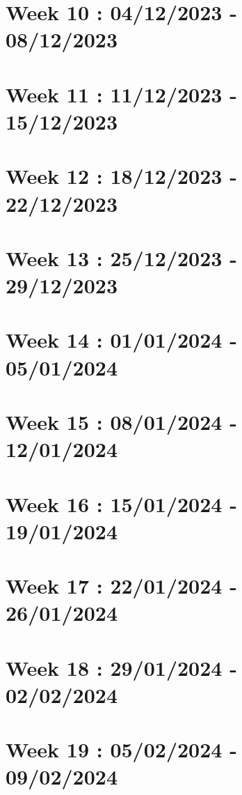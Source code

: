 \documentclass[french]{article}
\begin{document}
	\section{Week 10 : 04/12/2023 - 08/12/2023}
	

	\section{Week 11 : 11/12/2023 - 15/12/2023}
	

	\section{Week 12 : 18/12/2023 - 22/12/2023}
	

	\section{Week 13 : 25/12/2023 - 29/12/2023}
	

	\section{Week 14 : 01/01/2024 - 05/01/2024}
	

	\section{Week 15 : 08/01/2024 - 12/01/2024}
	

	\section{Week 16 : 15/01/2024 - 19/01/2024}
	

	\section{Week 17 : 22/01/2024 - 26/01/2024}
	

	\section{Week 18 : 29/01/2024 - 02/02/2024}
	

	\section{Week 19 : 05/02/2024 - 09/02/2024}
	
\end{document}
